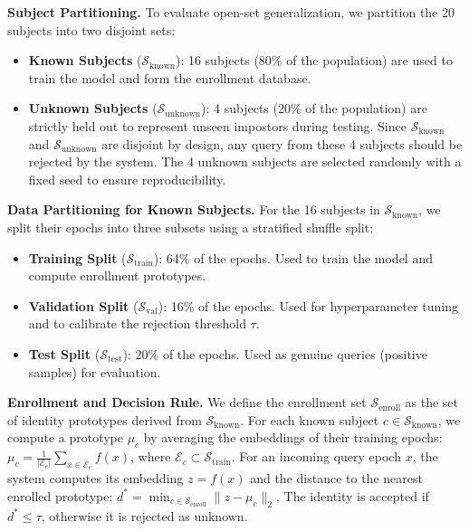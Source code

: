 \documentclass[conference]{IEEEtran}
\begin{document}
\textbf{Subject Partitioning.} To evaluate open-set generalization, we partition the 20 subjects into two disjoint sets:
\begin{itemize}
    \item \textbf{Known Subjects} ($\mathcal{S}_{\text{known}}$): 16 subjects (80\% of the population) are used to train the model and form the enrollment database.
    \item \textbf{Unknown Subjects} ($\mathcal{S}_{\text{unknown}}$): 4 subjects (20\% of the population) are strictly held out to represent unseen impostors during testing. Since $\mathcal{S}_{\text{known}}$ and $\mathcal{S}_{\text{unknown}}$ are disjoint by design, any query from these 4 subjects should be rejected by the system. The 4 unknown subjects are selected randomly with a fixed seed to ensure reproducibility.
\end{itemize}

\textbf{Data Partitioning for Known Subjects.} For the 16 subjects in $\mathcal{S}_{\text{known}}$, we split their epochs into three subsets using a stratified shuffle split:
\begin{itemize}
    \item \textbf{Training Split} ($\mathcal{S}_{\text{train}}$): 64\% of the epochs. Used to train the model and compute enrollment prototypes.
    \item \textbf{Validation Split} ($\mathcal{S}_{\text{val}}$): 16\% of the epochs. Used for hyperparameter tuning and to calibrate the rejection threshold $\tau$.
    \item \textbf{Test Split} ($\mathcal{S}_{\text{test}}$): 20\% of the epochs. Used as genuine queries (positive samples) for evaluation.
\end{itemize}

\textbf{Enrollment and Decision Rule.} We define the enrollment set $\mathcal{S}_{\text{enroll}}$ as the set of identity prototypes derived from $\mathcal{S}_{\text{known}}$. For each known subject $c \in \mathcal{S}_{\text{known}}$, we compute a prototype $\mu_c$ by averaging the embeddings of their training epochs: $\mu_c = \frac{1}{|\mathcal{E}_c|} \sum_{x \in \mathcal{E}_c} f(x)$, where $\mathcal{E}_c \subset \mathcal{S}_{\text{train}}$. For an incoming query epoch $x$, the system computes its embedding $z = f(x)$ and the distance to the nearest enrolled prototype: $d^* = \min_{c \in \mathcal{S}_{\text{enroll}}} \|z - \mu_c\|_2$. The identity is accepted if $d^* \leq \tau$, otherwise it is rejected as unknown.
\end{document}
